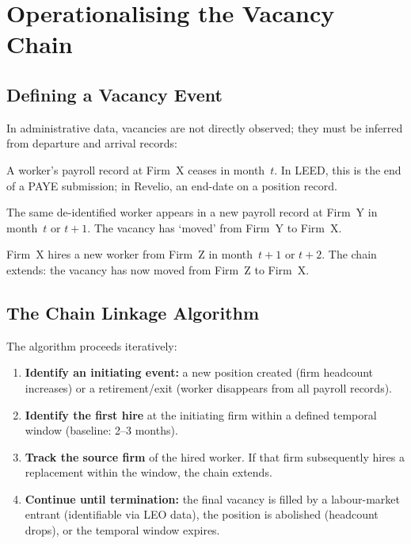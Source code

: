 \documentclass[a4paper]{tufte-handout}
\begin{document}
\section{Operationalising the Vacancy Chain}

\subsection{Defining a Vacancy Event}

In administrative data, vacancies are not directly observed; they must be
inferred from departure and arrival records:

\begin{description}[style=nextline, font=\normalfont\itshape]
	\item[Departure signal] A worker's payroll record at Firm~X ceases in
	      month~$t$. In LEED, this is the end of a PAYE submission; in Revelio, an
	      end-date on a position record.

	\item[Arrival signal] The same de-identified worker appears in a new payroll
	      record at Firm~Y in month~$t$ or $t{+}1$. The vacancy has `moved' from
	      Firm~Y to Firm~X\@.

	\item[Replacement signal] Firm~X hires a new worker from Firm~Z in
	      month~$t{+}1$ or $t{+}2$. The chain extends: the vacancy has now moved from
	      Firm~Z to Firm~X\@.
\end{description}


\subsection{The Chain Linkage Algorithm}

The algorithm proceeds iteratively:

\begin{enumerate}
	\item \textbf{Identify an initiating event:} a new position created (firm
	      headcount increases) or a retirement/exit (worker disappears from all
	      payroll records).

	\item \textbf{Identify the first hire} at the initiating firm within a
	      defined temporal window (baseline: 2--3 months).

	\item \textbf{Track the source firm} of the hired worker. If that firm
	      subsequently hires a replacement within the window, the chain extends.

	\item \textbf{Continue until termination:} the final vacancy is filled by a
	      labour-market entrant (identifiable via LEO data), the position is
	      abolished (headcount drops), or the temporal window expires.
\end{enumerate}
\end{document}
